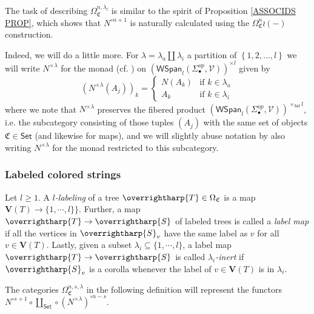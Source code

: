 \documentclass[a4paper,10pt
,draft
]{article}%
\numberwithin{equation}{section}
\numberwithin{figure}{section}
\theoremstyle{definition} %
\newcommand{\set}[1]{\left\{#1\right\}}%
\newcommand{\vect}[1]{\text{\overrightharp{\ensuremath{#1}}}}
\newcommand{\1}{\ensuremath{\mathbbm 1}}%
\begin{document}
The task of describing 
$\Omega^{n,\lambda_l}_{\mathfrak{C}}$
is similar to the spirit of Proposition \ref{ASSOCIDS PROP}, which shows that
$N^{\circ n+1}$ is naturally calculated using the
$\Omega_{\mathfrak{C}}^{n} \wr (-)$ 
construction.


Indeed, we will do a little more. For $\lambda = \lambda_a \amalg \lambda_i$
a partition of $\set{1,2,\dots,l}$
we will write 
$N^{\times \lambda}$
for the monad (cf. \cite[\S 2.3]{BP_geo}) on 
$\left(\mathsf{WSpan}_l(\Sigma_{\bullet}^{op},\mathcal{V})\right)^{\times l}$
given by
\[
\left(N^{\times \lambda} (A_j)\right)_k = 
\begin{cases}
N(A_k) & \text{if } k\in \lambda_a
\\
A_k & \text{if } k\in \lambda_i
\end{cases}
\]
where we note that $N^{\times \lambda}$
preserves the fibered product
$\left(\mathsf{WSpan}_l(\Sigma_{\bullet}^{op},\mathcal{V})\right)^{\times_{\mathsf{Set}} l}$,
i.e. the subcategory consisting of those tuples $(A_j)$ with the same set of objects $\mathfrak{C} \in \mathsf{Set}$ (and likewise for maps), and we will slightly abuse notation by also writing 
$N^{\times \lambda}$
for the monad restricted to this subcategory.



\subsubsection*{Labeled colored strings}
\label{LCS_SEC}

Let $l \geq 1$. A \emph{$l$-labeling} of a tree $\vect{T} \in \Omega_{\mathfrak{C}}$ is a map
$\boldsymbol{V}(T) \to \{1,\cdots,l\}\}$.
Further, a map 
$\vect{T} \to \vect{S}$ of labeled trees
is called a \emph{label map}
if all the vertices in $\vect{S}_v$
have the same label as $v$
for all $v \in \boldsymbol{V}(T)$.
Lastly, given a subset $\lambda_i \subseteq \{1,\cdots,l\}$,
a label map 
$\vect{T} \to \vect{S}$
is called \emph{$\lambda_i$-inert}
if $\vect{S}_v$ is a corolla whenever the label of
$v \in \boldsymbol{V}(T)$ is in $\lambda_i$.

 

The categories $\Omega_{\mathfrak C}^{n,s,\lambda}$ in the following definition will represent
the functors
$N^{\circ s+1} \circ \coprod_{\mathsf{Set}} \circ \left(N^{\times \lambda}\right)^{\circ n-s}$.
\end{document}
